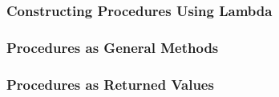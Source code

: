             \subsubsection{Constructing Procedures Using Lambda}
            \subsubsection{Procedures as General Methods}
            \subsubsection{Procedures as Returned Values}

